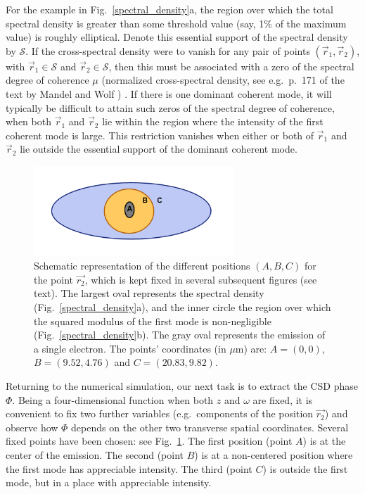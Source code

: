 \documentclass[%
 reprint,
 amsmath,amssymb,
 aps,
]{revtex4-1}
\begin{document}
For the example in Fig.~\ref{spectral_density}a, the region over which the total spectral density is greater than some threshold value (say, 1\% of the maximum value) is roughly elliptical.  Denote this essential support of the spectral density by $\mathcal{S}$.  If the cross-spectral density were to vanish for any pair of points $(\vec{r}_1,\vec{r}_2)$, with $\vec{r}_1 \in \mathcal{S}$ and $\vec{r}_2 \in \mathcal{S}$, then this must be associated with a zero of the spectral degree of coherence $\mu$ (normalized cross-spectral density, see e.g.~p.~171 of the text by Mandel and Wolf \cite{mandel_wolf}) \cite{GburSPIE}. If there is one dominant coherent mode, it will typically be difficult to attain such zeros of the spectral degree of coherence, when both $\vec{r}_1$ and $\vec{r}_2$ lie within the region where the intensity of the first coherent mode is large.  This restriction vanishes when either or both of $\vec{r}_1$ and $\vec{r}_2$ lie outside the essential support of the dominant coherent mode.  

\begin{figure}
\includegraphics[trim=0 8mm 0 0,clip, width=7.5cm]{Figures/eye.png}
\caption{Schematic representation of the different positions $(A,B,C)$ for the point $\vec{r_2}$, which is kept fixed in several subsequent figures (see text). The largest oval represents the spectral density (Fig.~\ref{spectral_density}a), and the inner circle the region over which the squared modulus of the first mode is non-negligible (Fig.~\ref{spectral_density}b). The gray oval represents the emission of a single electron. 
The points' coordinates (in $\mu$m) are: $A=(0,0)$, $B=(9.52,4.76)$ and $C=(20.83,9.82)$.}
\label{eye}
\end{figure}

Returning to the numerical simulation, our next task is to extract the CSD phase $\Phi$. Being a four-dimensional function when both $z$ and $\omega$ are fixed, it is convenient to fix two further variables (e.g.~components of the position $\vec{r_2}$) and observe how $\Phi$ depends on the other two transverse spatial coordinates. Several fixed points have been chosen: see Fig.~\ref{eye}. The first position (point $A$) is at the center of the emission. The second (point $B$) is at a non-centered position where the first mode has appreciable intensity. The third (point $C$) is outside the first mode, but in a place with appreciable intensity.
\end{document}
